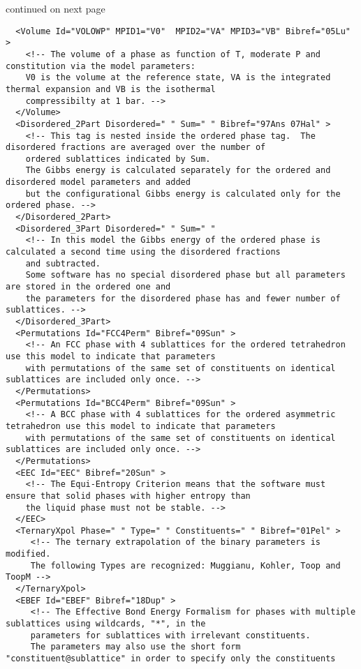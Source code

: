 \documentclass{article}
\begin{document}
\begin{appendices}
\bigskip
continued on next page

\newpage
{\small
\begin{verbatim}
  <Volume Id="VOLOWP" MPID1="V0"  MPID2="VA" MPID3="VB" Bibref="05Lu" > 
    <!-- The volume of a phase as function of T, moderate P and constitution via the model parameters:
    V0 is the volume at the reference state, VA is the integrated thermal expansion and VB is the isothermal
    compressibilty at 1 bar. -->
  </Volume>
  <Disordered_2Part Disordered=" " Sum=" " Bibref="97Ans 07Hal" > 
    <!-- This tag is nested inside the ordered phase tag.  The disordered fractions are averaged over the number of
    ordered sublattices indicated by Sum.
    The Gibbs energy is calculated separately for the ordered and disordered model parameters and added 
    but the configurational Gibbs energy is calculated only for the ordered phase. -->
  </Disordered_2Part>
  <Disordered_3Part Disordered=" " Sum=" "
    <!-- In this model the Gibbs energy of the ordered phase is calculated a second time using the disordered fractions
    and subtracted.
    Some software has no special disordered phase but all parameters are stored in the ordered one and
    the parameters for the disordered phase has and fewer number of sublattices. -->
  </Disordered_3Part>
  <Permutations Id="FCC4Perm" Bibref="09Sun" > 
    <!-- An FCC phase with 4 sublattices for the ordered tetrahedron use this model to indicate that parameters 
    with permutations of the same set of constituents on identical sublattices are included only once. -->
  </Permutations>
  <Permutations Id="BCC4Perm" Bibref="09Sun" > 
    <!-- A BCC phase with 4 sublattices for the ordered asymmetric tetrahedron use this model to indicate that parameters 
    with permutations of the same set of constituents on identical sublattices are included only once. -->
  </Permutations>
  <EEC Id="EEC" Bibref="20Sun" > 
    <!-- The Equi-Entropy Criterion means that the software must ensure that solid phases with higher entropy than
    the liquid phase must not be stable. -->
  </EEC>
  <TernaryXpol Phase=" " Type=" " Constituents=" " Bibref="01Pel" > 
     <!-- The ternary extrapolation of the binary parameters is modified.
     The following Types are recognized: Muggianu, Kohler, Toop and ToopM -->
  </TernaryXpol>
  <EBEF Id="EBEF" Bibref="18Dup" > 
     <!-- The Effective Bond Energy Formalism for phases with multiple sublattices using wildcards, "*", in the
     parameters for sublattices with irrelevant constituents.
     The parameters may also use the short form "constituent@sublattice" in order to specify only the constituents

\end{verbatim}}
\end{appendices}
\end{document}
